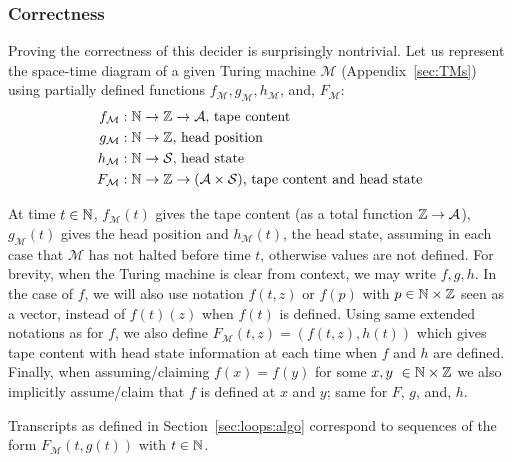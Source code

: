 \subsubsection{Correctness}
Proving the correctness of this decider is surprisingly nontrivial. Let us represent the space-time diagram of a given Turing machine $\mathcal{M}$ (Appendix~\ref{sec:TMs}) using partially defined functions $f_\mathcal{M},g_\mathcal{M},h_\mathcal{M}$, and, $F_\mathcal{M}$:
\begin{align*}
    f_\mathcal{M} & : \mathbb{N} \to \mathbb{Z} \to \mathcal{A}\text{, tape content}                                \\
    g_\mathcal{M} & : \mathbb{N} \to \mathbb{Z}\text{, head position}                                             \\
    h_\mathcal{M} & : \mathbb{N} \to \mathcal{S}\text{, head state}                                           \\
    F_\mathcal{M} & : \mathbb{N} \to \mathbb{Z} \to (\mathcal{A}\times \mathcal{S})\text{, tape content and head state}
\end{align*}

\newcommand{\baref}{F}

At time $t\in\mathbb{N}$, $f_\mathcal{M}(t)$ gives the tape content (as a total function $\mathbb{Z} \to \mathcal{A}$), $g_\mathcal{M}(t)$ gives the head position and $h_\mathcal{M}(t)$, the head state, assuming in each case that $\mathcal{M}$ has not halted before time $t$, otherwise values are not defined. For brevity, when the Turing machine is clear from context, we may write $f,g,h$. In the case of $f$, we will also use notation $f(t,z)$ or $f(p)$ with $p \in \mathbb{N} \times \mathbb{Z}$ seen as a vector, instead of $f(t)(z)$ when $f(t)$ is defined. Using same extended notations as for $f$, we also define $\baref_\mathcal{M}(t,z) = (f(t,z),h(t))$ which gives tape content with head state information at each time when $f$ and $h$ are defined.
Finally, when assuming/claiming $f(x) = f(y)$ for some $x,y \in \N \times \Z$ we also implicitly assume/claim that $f$ is defined at $x$ and $y$; same for $\baref$, $g$, and, $h$.

Transcripts as defined in Section~\ref{sec:loops:algo} correspond to sequences of the form $F_\mathcal{M}(t,g(t))$ with $t\in\mathbb{N}$.

